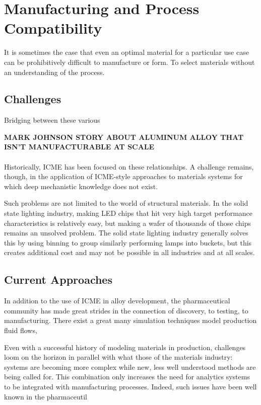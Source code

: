 

\section{Manufacturing and Process Compatibility}
It is sometimes the case that even an optimal material for a particular use case can be prohibitively difficult to manufacture or form. To select materials without an understanding of the process. 

\subsection{Challenges}
Bridging between these various 

\textbf{MARK JOHNSON STORY ABOUT ALUMINUM ALLOY THAT ISN'T MANUFACTURABLE AT SCALE}\\
\\
Historically, ICME has been focused on these relationships. A challenge remains, though, in the application of ICME-style approaches to materials systems for which deep mechanistic knowledge does not exist. 

Such problems are not limited to the world of structural materials. In the solid state lighting industry, making LED chips that hit very high target performance characteristics is relatively easy, but making a wafer of thousands of those chips remains an unsolved problem. The solid state lighting industry generally solves this by using binning to group similarly performing lamps into buckets, but this creates additional cost and may not be possible in all industries and at all scales. 

\subsection{Current Approaches}
In addition to the use of ICME in alloy development, the pharmaceutical community has made great strides in the connection of discovery, to testing, to manufacturing. There exist a great many simulation techniques model production fluid flows,

Even with a successful history of modeling materials in production, challenges loom on the horizon in parallel with what those of the materials industry: systems are becoming more complex while new, less well understood methods are being called for. This combination only increases the need for analytics systems to be integrated with manufacturing processes.\cite{JPS:JPS24594} Indeed, such issues have been well known in the pharmaceutil


